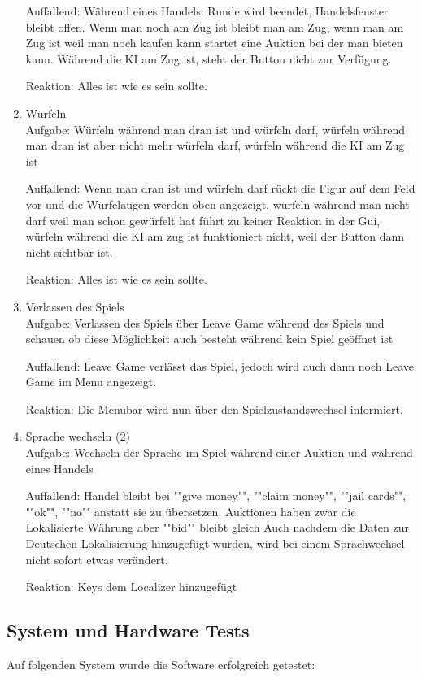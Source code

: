 \documentclass[a4paper,10pt]{article}
\begin{document}
\begin{enumerate}
Auffallend: Während eines Handels: Runde wird beendet, Handelsfenster bleibt offen. Wenn man noch am Zug ist bleibt man am Zug, wenn man am Zug ist weil man noch kaufen kann startet eine Auktion bei der man bieten kann. Während die KI am Zug ist, steht der Button nicht zur Verfügung.

Reaktion: Alles ist wie es sein sollte.
\item Würfeln\\
Aufgabe: Würfeln während man dran ist und würfeln darf, würfeln während man dran ist aber nicht mehr würfeln darf, würfeln während die KI am Zug ist

Auffallend: Wenn man dran ist und würfeln darf rückt die Figur auf dem Feld vor und die Würfelaugen werden oben angezeigt, würfeln während man nicht darf weil man schon gewürfelt hat führt zu keiner Reaktion in der Gui, würfeln während die KI am zug ist funktioniert nicht, weil der Button dann nicht sichtbar ist.

Reaktion: Alles ist wie es sein sollte.
\item Verlassen des Spiels\\
Aufgabe: Verlassen des Spiels über Leave Game während des Spiels und schauen ob diese Möglichkeit auch besteht während kein Spiel geöffnet ist

Auffallend: Leave Game verlässt das Spiel, jedoch wird auch dann noch Leave Game im Menu angezeigt.

Reaktion: Die Menubar wird nun über den Spielzustandswechsel informiert.
\item Sprache wechseln (2)\\
Aufgabe: Wechseln der Sprache im Spiel während einer Auktion und während eines Handels

Auffallend: Handel bleibt bei ""give money"", ""claim money"", ""jail cards"", ""ok"", ""no"" anstatt sie zu übersetzen. Auktionen haben zwar die Lokalisierte Währung aber ""bid"" bleibt gleich
Auch nachdem die Daten zur Deutschen Lokalisierung hinzugefügt wurden, wird bei einem Sprachwechsel nicht sofort etwas verändert.

Reaktion: Keys dem Localizer hinzugefügt
\end{enumerate}


\subsection{System und Hardware Tests}

Auf folgenden System wurde die Software erfolgreich getestet:
\end{document}
